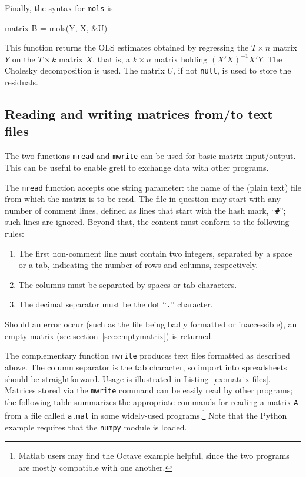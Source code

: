 Finally, the syntax for \texttt{mols} is
%
\begin{code}
matrix B = mols(Y, X, &U)
\end{code}
%
This function returns the OLS estimates obtained by regressing the $T
\times n$ matrix $Y$ on the $T \times k$ matrix $X$, that is, a $k
\times n$ matrix holding $(X'X)^{-1} X'Y$. The Cholesky decomposition
is used. The matrix $U$, if not \texttt{null}, is used to store the
residuals.

\subsection{Reading and writing matrices from/to text files}
\label{sec:matrix-csv}

The two functions \texttt{mread} and \texttt{mwrite} can be used for
basic matrix input/output. This can be useful to enable gretl to
exchange data with other programs.

The \texttt{mread} function accepts one string parameter: the name of
the (plain text) file from which the matrix is to be read.  The file
in question may start with any number of comment lines, defined as
lines that start with the hash mark, ``\texttt{\#}''; such lines are
ignored.  Beyond that, the content must conform to the following
rules:
%
\begin{enumerate}
\item The first non-comment line must contain two integers, separated
  by a space or a tab, indicating the number of rows and columns,
  respectively.
\item The columns must be separated by spaces or tab characters.
\item The decimal separator must be the dot ``\texttt{.}'' character.
\end{enumerate}

Should an error occur (such as the file being badly formatted or
inaccessible), an empty matrix (see section~\ref{sec:emptymatrix}) is
returned.

The complementary function \texttt{mwrite} produces text files
formatted as described above.  The column separator is the tab
character, so import into spreadsheets should be straightforward.
Usage is illustrated in Listing~\ref{ex:matrix-files}.  Matrices
stored via the \texttt{mwrite} command can be easily read by other
programs; the following table summarizes the appropriate commands for
reading a matrix \texttt{A} from a file called \texttt{a.mat} in some
widely-used programs.\footnote{Matlab users may find the Octave
  example helpful, since the two programs are mostly compatible with
  one another.} Note that the Python example requires that the
\texttt{numpy} module is loaded.


